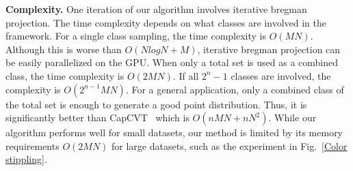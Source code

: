 \textbf{Complexity.}
One iteration of our algorithm involves iterative bregman projection.
The time complexity depends on what classes are involved in the framework.
For a single class sampling,
the time complexity is $O(MN)$.
Although this is worse than $O(NlogN+M)$,
iterative bregman projection can be easily parallelized on the GPU.
When only a total set is used as a combined class,
the time complexity is $O(2MN)$.
If all $2^n-1$ classes are involved,
the complexity is $O(2^{n-1}MN)$.
For a general application,
only a combined class of the total set is enough to generate a good point distribution.
Thus, it is significantly better than CapCVT~\cite{chen:2012:variational} which is $O(nMN+nN^2)$.
While our algorithm performs well for small datasets,
our method is limited by its memory requirements $O(2MN)$ for large datasets, such as the experiment in Fig.~\ref{Color stippling}.


